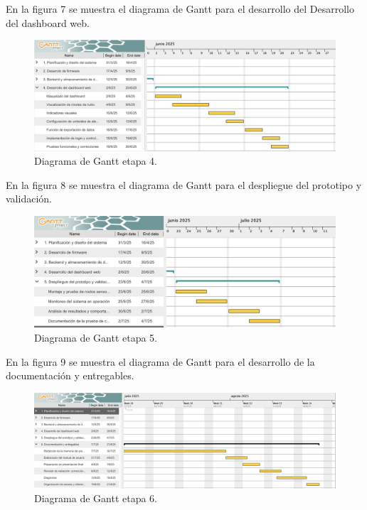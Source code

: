 \documentclass[
11pt, %
]{charter}
\begin{document}
En la figura 7 se muestra el diagrama de Gantt para el desarrollo del Desarrollo del dashboard web.
\begin{figure}[htpb]
    \centering 
    \includegraphics[width=1.05\textwidth]{./Figuras/gantt5.png}
    \caption{Diagrama de Gantt etapa 4.}
    \label{fig:AoN}
    \end{figure}

En la figura 8 se muestra el diagrama de Gantt para el despliegue del prototipo y validación.
\begin{figure}[htpb]
    \centering 
    \includegraphics[width=1.05\textwidth]{./Figuras/gantt6.png}
    \caption{Diagrama de Gantt etapa 5.}
    \label{fig:AoN}
    \end{figure}

En la figura 9 se muestra el diagrama de Gantt para el desarrollo de la documentación y entregables.
\begin{figure}[htpb]
    \centering 
    \includegraphics[width=1.05\textwidth]{./Figuras/gantt7.png}
    \caption{Diagrama de Gantt etapa 6.}
    \label{fig:AoN}
    \end{figure}
\end{document}
